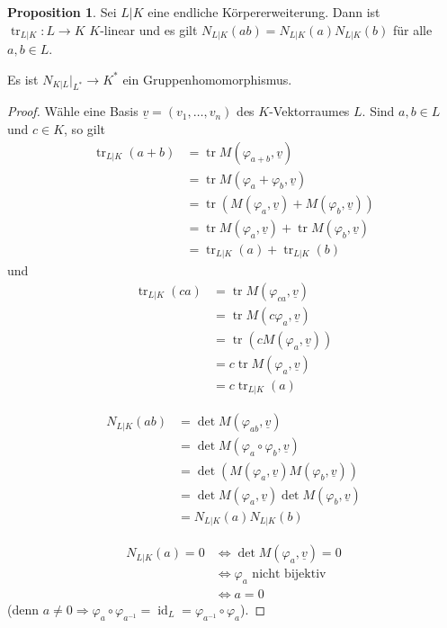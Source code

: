 \documentclass[
twoside=semi,
fontsize=12,
DIV=12, 
cleardoublepage=current,
leqno,
headings=optiontoheadandtoc, 
toc=idx
]{scrbook}
\DeclareMathOperator{\id}{id}
\DeclareMathOperator{\tr}{tr}
\theoremstyle{definition}
\newtheorem{proposition}[definition]{Proposition}
\begin{document}
	\begin{proposition}\label{2.4.3}
		Sei $L|K$ eine endliche K\"orpererweiterung. Dann ist $\tr_{L|K}:L \to K$ $K$-linear und es gilt $N_{L|K}(ab) = N_{L|K}(a)N_{L|K}(b)$ f\"ur alle $a,b \in L$.
		
		Es ist $N_{K|L}\big|_{L^*} \to K^*$ ein Gruppenhomomorphismus.
		
		\begin{proof}
			W\"ahle eine Basis $\underline{v} = (v_1, \dots, v_n)$ des $K$-Vektorraumes $L$. Sind $a,b \in L$ und $c \in K$, so gilt 
			\begin{align*}
				\tr_{L|K}(a+b) &= \tr M(\varphi_{a+b}, \underline{v})\\
				&= \tr M(\varphi_a + \varphi_b, \underline{v})\\
				&= \tr (M(\varphi_a, \underline{v}) + M(\varphi_b, \underline{v}))\\
				&= \tr M(\varphi_a, \underline{v}) + \tr M(\varphi_b, \underline{v})\\
				&= \tr_{L|K}(a) + \tr_{L|K}(b)
			\end{align*}
			und 
			\begin{align*}
				\tr_{L|K}(ca) &= \tr M(\varphi_{ca}, \underline{v})\\
				&= \tr M(c\varphi_{a}, \underline{v})\\
				&= \tr (cM(\varphi_{a}, \underline{v}))\\
				&= c \tr M(\varphi_{a}, \underline{v})\\
				&= c \tr_{L|K}(a)
			\end{align*}
			
			\begin{align*}
				N_{L|K}(ab) &= \det M(\varphi_{ab}, \underline{v})\\
				&=\det M(\varphi_{a} \circ \varphi_b, \underline{v})\\
				&=\det (M(\varphi_{a}, \underline{v}) M(\varphi_b, \underline{v}))\\
				&=\det M(\varphi_{a}, \underline{v}) \det M(\varphi_b, \underline{v})\\
				&= N_{L|K}(a)N_{L|K}(b)
			\end{align*}
		
			\begin{align*}
				N_{L|K}(a) = 0 &\Leftrightarrow \det M(\varphi_{a}, \underline{v}) = 0\\
				&\Leftrightarrow \varphi_{a} \textrm{ nicht bijektiv}\\
				&\Leftrightarrow a = 0
			\end{align*}
			(denn $a\neq 0 \Rightarrow \varphi_{a} \circ \varphi_{a^{-1}} = \id_L = \varphi_{a^{-1}} \circ \varphi_{a}$).
		\end{proof} 
	\end{proposition}
\end{document}
